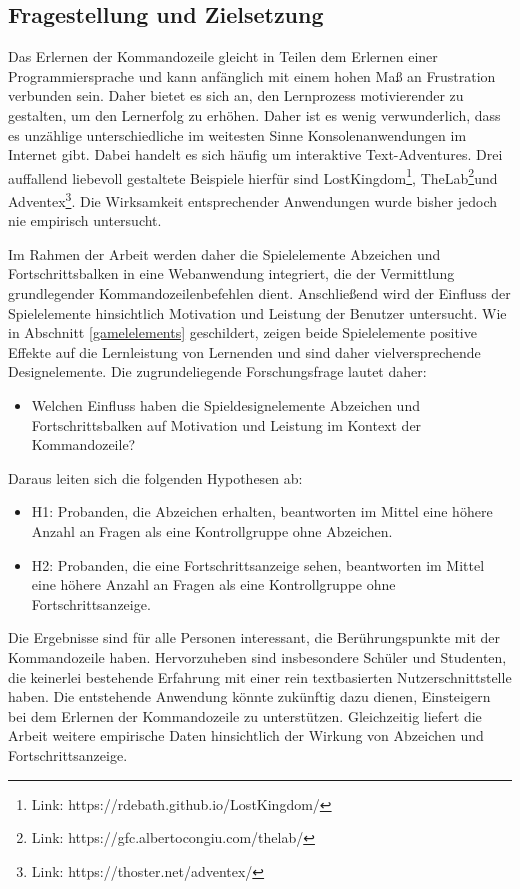 \subsection{Fragestellung und Zielsetzung}
Das Erlernen der Kommandozeile gleicht in Teilen dem Erlernen einer Programmiersprache und kann anfänglich mit einem hohen Maß an Frustration verbunden sein. Daher bietet es sich an, den Lernprozess motivierender zu gestalten, um den Lernerfolg zu erhöhen. Daher ist es wenig verwunderlich, dass es unzählige unterschiedliche im weitesten Sinne  Konsolenanwendungen im Internet gibt. Dabei handelt es sich häufig um interaktive Text-Adventures. Drei auffallend liebevoll gestaltete Beispiele hierfür sind LostKingdom\footnote{Link: https://rdebath.github.io/LostKingdom/}, TheLab\footnote{Link: https://gfc.albertocongiu.com/thelab/}und Adventex\footnote{Link: https://thoster.net/adventex/}. Die Wirksamkeit entsprechender Anwendungen wurde bisher jedoch nie empirisch untersucht. 

Im Rahmen der Arbeit werden daher die Spielelemente Abzeichen und Fortschrittsbalken in eine Webanwendung integriert, die der Vermittlung grundlegender Kommandozeilenbefehlen dient. Anschließend wird der Einfluss der Spielelemente hinsichtlich Motivation und Leistung der Benutzer untersucht. Wie in Abschnitt \ref{gamelelements} geschildert, zeigen beide Spielelemente positive Effekte auf die Lernleistung von Lernenden und sind daher vielversprechende Designelemente. Die zugrundeliegende Forschungsfrage lautet daher:

\begin{itemize}
    \item Welchen Einfluss haben die Spieldesignelemente Abzeichen und Fortschrittsbalken auf Motivation und Leistung im Kontext der Kommandozeile?
\end{itemize}

Daraus leiten sich die folgenden Hypothesen ab:

\begin{itemize}
\item H1: Probanden, die Abzeichen erhalten, beantworten im Mittel eine höhere Anzahl an Fragen als eine Kontrollgruppe ohne Abzeichen.
\item H2: Probanden, die eine Fortschrittsanzeige sehen, beantworten im Mittel eine höhere Anzahl an Fragen als eine Kontrollgruppe ohne Fortschrittsanzeige.
\end{itemize}

Die Ergebnisse sind für alle Personen interessant, die Berührungspunkte mit der Kommandozeile haben.
Hervorzuheben sind insbesondere Schüler und Studenten, die keinerlei bestehende Erfahrung mit einer rein textbasierten Nutzerschnittstelle haben. Die entstehende Anwendung könnte zukünftig dazu dienen, Einsteigern bei dem Erlernen der Kommandozeile zu unterstützen. Gleichzeitig liefert die Arbeit weitere empirische Daten hinsichtlich der Wirkung von Abzeichen und Fortschrittsanzeige.